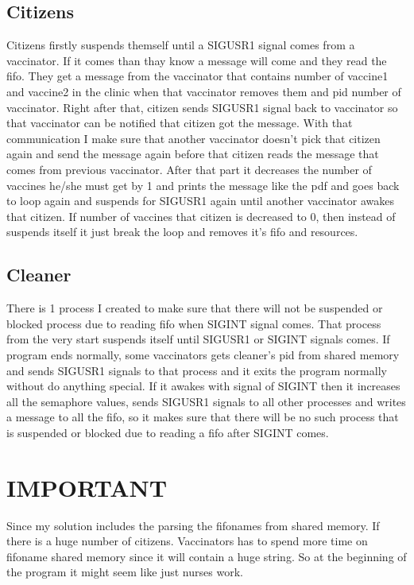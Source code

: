 \documentclass{article}
\begin{document}
\subsection{Citizens}
\par\hspace{\parindent} Citizens firstly suspends themself until a SIGUSR1 signal comes from a vaccinator. If it comes than thay know a message will come and they read the fifo. They get a message from the vaccinator that contains number of vaccine1 and vaccine2 in the clinic when that vaccinator removes them and pid number of vaccinator. Right after that, citizen sends SIGUSR1 signal back to vaccinator so that vaccinator can be notified that citizen got the message. With that communication I make sure that another vaccinator doesn't pick that citizen again and send the message again before that citizen reads the message that comes from previous vaccinator. After that part it decreases the number of vaccines he/she must get by 1 and prints the message like the pdf and goes back to loop again and suspends for SIGUSR1 again until another vaccinator awakes that citizen. If number of vaccines that citizen is decreased to 0, then instead of suspends itself it just break the loop and removes it's fifo and resources.

\subsection{Cleaner}
\par\hspace{\parindent} There is 1 process I created to make sure that there will not be suspended or blocked process due to reading fifo when SIGINT signal comes. That process from the very start suspends itself until SIGUSR1 or SIGINT signals comes. If program ends normally, some vaccinators gets cleaner's pid from shared memory and sends SIGUSR1 signals to that process and it exits the program normally without do anything special. If it awakes with signal of SIGINT then it increases all the semaphore values, sends SIGUSR1 signals to all other processes and writes a message to all the fifo, so it makes sure that there will be no such process that is suspended or blocked due to reading a fifo after SIGINT comes.

\section{IMPORTANT}
\par\hspace{\parindent} Since my solution includes the parsing the fifonames from shared memory. If there is a huge number of citizens. Vaccinators has to spend more time on fifoname shared memory since it will contain a huge string. So at the beginning of the program it might seem like just nurses work. 
\end{document}
